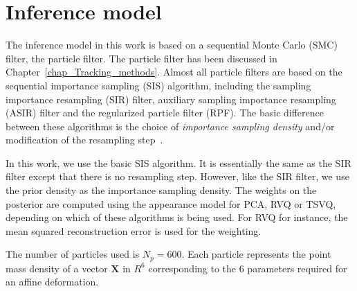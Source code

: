 \section{Inference model}
The inference model in this work is based on a sequential Monte Carlo (SMC) filter, the particle filter.  The particle filter has been discussed in Chapter~\ref{chap_Tracking_methods}.  Almost all particle filters are based on the sequential importance sampling (SIS) algorithm, including the sampling importance resampling (SIR) filter, auxiliary sampling importance resampling (ASIR) filter and the regularized particle filter (RPF).  The basic difference between these algorithms is the choice of \emph{importance sampling density} and/or modification of the resampling step~\cite{2002_JNL_PF_Arulampalam}.  

In this work, we use the basic SIS algorithm.  It is essentially the same as the SIR filter except that there is no resampling step.  However, like the SIR filter, we use the prior density as the importance sampling density.  The weights on the posterior are computed using the appearance model for PCA, RVQ or TSVQ, depending on which of these algorithms is being used.  For RVQ for instance, the mean squared reconstruction error is used for the weighting.

The number of particles used is $N_p=600$.  Each particle represents the point mass density of a vector $\mathbf{X}$ in $R^6$ corresponding to the 6 parameters required for an affine deformation.

\cite{1992_JNL_MCMC_Carlin}








